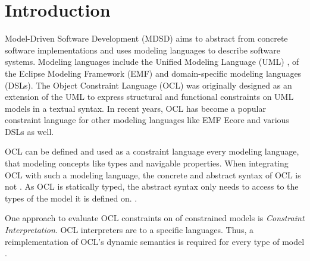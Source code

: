 \section{Introduction}

Model-Driven Software Development (MDSD) aims to abstract from concrete 
software implementations and uses modeling languages to describe 
software systems. Modeling languages include the Unified Modeling Language 
(UML) \cite{spec:UML2-2},  of the
Eclipse Modeling Framework (EMF) \cite{WWW:EMF} and domain-specific modeling languages (DSLs). The Object 
Constraint Language (OCL) \cite{spec:OCL2-2} was originally designed as 
an extension of the UML to express structural and functional constraints 
on UML models in a textual syntax. In recent years, OCL has become a 
popular constraint language for other modeling languages like EMF Ecore 
and various DSLs as well. 

OCL can be
defined and used as a constraint language  every modeling language, that  modeling concepts like types and navigable properties.
When integrating OCL with such a modeling language, the concrete and 
abstract syntax of OCL is not . As OCL is statically
typed, the abstract syntax only needs to access to the types of the model 
it is defined on. \cite{braeuerOCL07}.

One approach to evaluate 
OCL constraints on  
of constrained models is \textit{Constraint Interpretation}. 
OCL interpreters are  to a specific
 languages. Thus, a
reimplementation of OCL's dynamic semantics is required for every type of 
model . 

